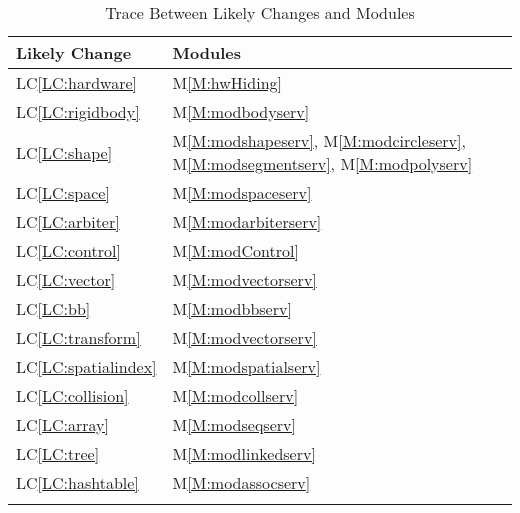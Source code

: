 \documentclass[12pt]{article}
\begin{document}
\begin{longtable}{l l}
\toprule
Likely Change & Modules
\\
\midrule
LC\ref{LC:hardware} & M\ref{M:hwHiding}
\\
LC\ref{LC:rigidbody} & M\ref{M:modbodyserv}
\\
LC\ref{LC:shape} & M\ref{M:modshapeserv}, M\ref{M:modcircleserv}, M\ref{M:modsegmentserv}, M\ref{M:modpolyserv}
\\
LC\ref{LC:space} & M\ref{M:modspaceserv}
\\
LC\ref{LC:arbiter} & M\ref{M:modarbiterserv}
\\
LC\ref{LC:control} & M\ref{M:modControl}
\\
LC\ref{LC:vector} & M\ref{M:modvectorserv}
\\
LC\ref{LC:bb} & M\ref{M:modbbserv}
\\
LC\ref{LC:transform} & M\ref{M:modvectorserv}
\\
LC\ref{LC:spatialindex} & M\ref{M:modspatialserv}
\\
LC\ref{LC:collision} & M\ref{M:modcollserv}
\\
LC\ref{LC:array} & M\ref{M:modseqserv}
\\
LC\ref{LC:tree} & M\ref{M:modlinkedserv}
\\
LC\ref{LC:hashtable} & M\ref{M:modassocserv}
\\
\bottomrule
\caption{Trace Between Likely Changes and Modules}
\label{Table:TracBetwLikeChanandModu}
\end{longtable}
\end{document}
